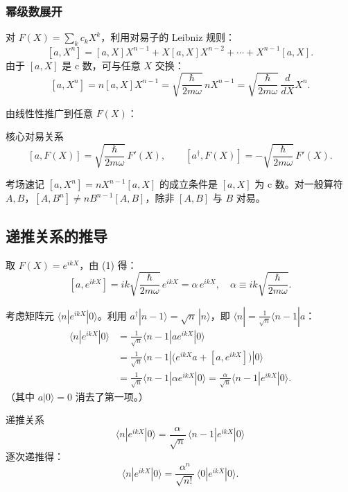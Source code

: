 \subsubsection{幂级数展开}

对 $F(X)=\sum_k c_k X^k$，利用对易子的 Leibniz 规则：
\[
  [a, X^n] = [a,X]X^{n-1} + X[a,X]X^{n-2} + \cdots + X^{n-1}[a,X].
\]
由于 $[a,X]$ 是 c 数，可与任意 $X$ 交换：
\[
  [a, X^n] = n[a,X]X^{n-1} = \sqrt{\frac{\hbar}{2m\omega}}\,nX^{n-1} = \sqrt{\frac{\hbar}{2m\omega}}\,\frac{d}{dX}X^n.
\]

由线性性推广到任意 $F(X)$：
\begin{formulabox}{核心对易关系}
\[
  \boxed{[a, F(X)] = \sqrt{\frac{\hbar}{2m\omega}}\,F'(X)}, \qquad
  \boxed{[a^\dagger, F(X)] = -\sqrt{\frac{\hbar}{2m\omega}}\,F'(X)}.
\]
\end{formulabox}

\begin{tipbox}{考场速记}
$[a, X^n] = nX^{n-1}[a,X]$ 的成立条件是 $[a,X]$ 为 c 数。对一般算符 $A,B$，$[A, B^n] \neq nB^{n-1}[A,B]$，除非 $[A,B]$ 与 $B$ 对易。
\end{tipbox}


\subsection{递推关系的推导}

取 $F(X)=e^{ikX}$，由 (1) 得：
\[
  [a, e^{ikX}] = ik\sqrt{\frac{\hbar}{2m\omega}}\,e^{ikX} = \alpha\,e^{ikX},
  \quad \alpha \equiv ik\sqrt{\frac{\hbar}{2m\omega}}.
\]

考虑矩阵元 $\langle n|e^{ikX}|0\rangle$。利用 $a^\dagger|n-1\rangle = \sqrt{n}\,|n\rangle$，即 $\langle n| = \frac{1}{\sqrt{n}}\langle n-1|a$：
\begin{align*}
  \langle n|e^{ikX}|0\rangle
  &= \frac{1}{\sqrt{n}}\langle n-1|a e^{ikX}|0\rangle \\
  &= \frac{1}{\sqrt{n}}\langle n-1|\bigl(e^{ikX}a + [a,e^{ikX}]\bigr)|0\rangle \\
  &= \frac{1}{\sqrt{n}}\langle n-1|\alpha e^{ikX}|0\rangle
   = \frac{\alpha}{\sqrt{n}}\langle n-1|e^{ikX}|0\rangle.
\end{align*}
（其中 $a|0\rangle=0$ 消去了第一项。）

\begin{formulabox}{递推关系}
\[
  \boxed{\langle n|e^{ikX}|0\rangle = \frac{\alpha}{\sqrt{n}}\,\langle n-1|e^{ikX}|0\rangle}
\]
逐次递推得：
\[
  \langle n|e^{ikX}|0\rangle = \frac{\alpha^n}{\sqrt{n!}}\,\langle 0|e^{ikX}|0\rangle.
\]
\end{formulabox}


